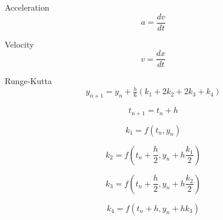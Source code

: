 \documentclass[10pt,a4paper,notitlepage]{report}
\begin{document}
Acceleration
\begin{equation}
a = \frac{dv}{dt}
\end{equation}

Velocity
\begin{equation}
v = \frac{dx}{dt}
\end{equation}

Runge-Kutta
\begin{equation}
y_{n+1} = y_n + \tfrac{h}{6}\left(k_1 + 2k_2 + 2k_3 + k_4 \right)
\end{equation}

\begin{equation}
t_{n+1} = t_n + h 
\end{equation}

\begin{equation}
k_1 = f(t_n, y_n)
\end{equation}

\begin{equation}
k_2 = f\left(t_n + \frac{h}{2}, y_n + h\frac{k_1}{2}\right)
\end{equation}

\begin{equation}
k_3 = f\left(t_n + \frac{h}{2}, y_n + h\frac{k_2}{2}\right)
\end{equation}

\begin{equation}
k_4 = f\left(t_n + h, y_n + hk_3\right)
\end{equation}
\end{document}
